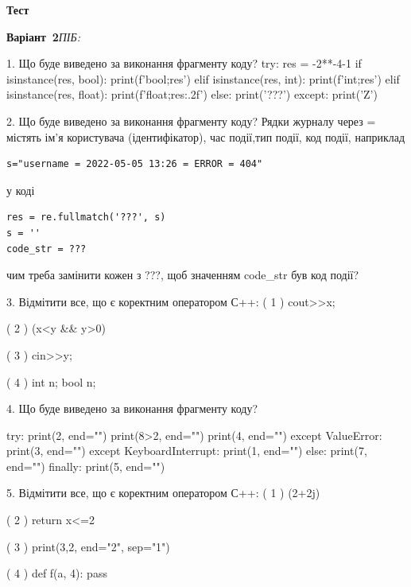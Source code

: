 \documentclass[11pt]{article}
\begin{document}
{\large\textbf{Тест}}

\textbf{Варіант \No\,2}\hfill \textit{ПІБ:}\,\underline{\hspace{60mm}}
\vspace{4mm}

1. %
Що буде виведено за виконання фрагменту коду?
try:
    res = -2**-4-1
    if isinstance(res, bool):
        print(f'bool;{res}')
    elif isinstance(res, int):
        print(f'int;{res}')
    elif isinstance(res, float):
        print(f'float;{res:.2f}')
    else:
        print('???')
except:
    print('Z')



2. %
Що буде виведено за виконання фрагменту коду?
Рядки журналу через = містять ім'я користувача (ідентифікатор), час події,тип події, код події, наприклад
\begin{verbatim}
s="username = 2022-05-05 13:26 = ERROR = 404"
\end{verbatim}
у коді 
\begin{verbatim}
res = re.fullmatch('???', s) 
s = ''
code_str = ??? 
\end{verbatim}
чим треба замінити кожен з ???, щоб значенням code\_str був код події? 





3. %
Відмітити все, що є коректним оператором С++:
( 1 ) cout>>x;

( 2 ) (x<y && y>0)

( 3 ) cin>>y;

( 4 ) int n; bool n;



4. %
Що буде виведено за виконання фрагменту коду?

try:
    print(2, end="")
    print(8>2, end="")
    print(4, end="")
except ValueError: 
    print(3, end="")
except KeyboardInterrupt: 
    print(1, end="")
else:
    print(7, end="")
finally:
    print(5, end="")




5. %
Відмітити все, що є коректним оператором С++:
( 1 ) (2+2j)%

( 2 ) return x<=2

( 3 ) print(3,2, end="2", sep="1")

( 4 ) def f(a, 4): pass



\newpage
\end{document}
